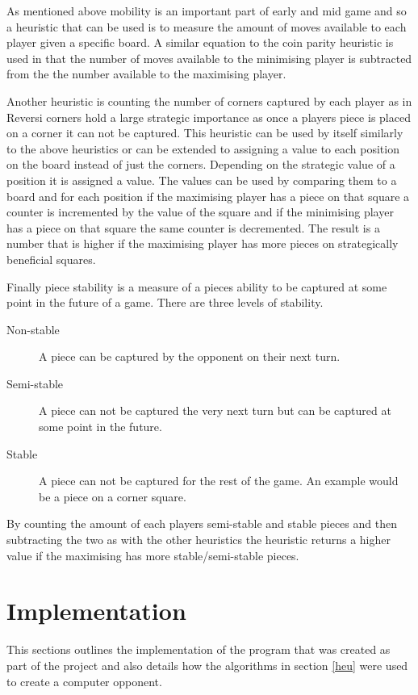 \documentclass[final]{cmpreport}
\begin{document}
As mentioned above mobility is an important part of early and mid game and so a heuristic that can be used is to measure the amount of moves available to each player given a specific board. A similar equation to the coin parity heuristic is used in that the number of moves available to the minimising player is subtracted from the the number available to the maximising player.

Another heuristic is counting the number of corners captured by each player as in Reversi corners hold a large strategic importance as once a players piece is placed on a corner it can not be captured. This heuristic can be used by itself similarly to the above heuristics or can be extended to assigning a value to each position on the board instead of just the corners. Depending on the strategic value of a position it is assigned a value. The values can be used by comparing them to a board and for each position if the maximising player has a piece on that square a counter is incremented by the value of the square and if the minimising player has a piece on that square the same counter is decremented. The result is a number that is higher if the maximising player has more pieces on strategically beneficial squares.

Finally piece stability is a measure of a pieces ability to be captured at some point in the future of a game. There are three levels of stability.
\begin{description}
	\item[Non-stable] A piece can be captured by the opponent on their next turn.
	\item[Semi-stable] A piece can not be captured the very next turn but can be captured at some point in the future.
	\item[Stable] A piece can not be captured for the rest of the game. An example would be a piece on a corner square.
\end{description}
By counting the amount of each players semi-stable and stable pieces and then subtracting the two as with the other heuristics the heuristic returns a higher value if the maximising has more stable/semi-stable pieces.
\section{Implementation}
This sections outlines the implementation of the program that was created as part of the project and also details how the algorithms in section \ref{heu} were used to create a computer opponent.
\end{document}
